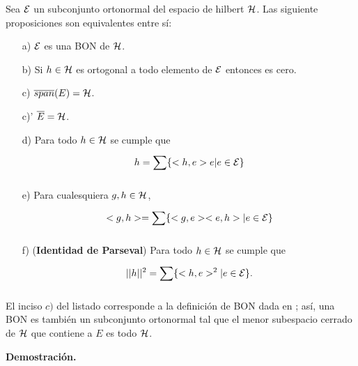 \begin{teo} \label{thm: Coway, 4.13}
Sea $\mathcal{E}$ un subconjunto ortonormal del espacio
de hilbert $\mathcal{H}$.
Las siguiente proposiciones son equivalentes entre sí:
\begin{itemize}
\item[a)] $\mathcal{E}$ es una BON de $\mathcal{H}$.
\item[b)] Si $h \in \mathcal{H}$ es ortogonal a todo elemento de 
$\mathcal{E}$ entonces es cero.
\item[c)] $\overline{span}(E)= \mathcal{H} $.
\item[c)'] $\overline{E}=\mathcal{H}$. 
\item[d)] Para todo $h \in \mathcal{H}$ se cumple que
\[
h = \sum\limits_{}^{}\{ <h,e> e | e \in \mathcal{E} \}
\]
\item[e)] Para cualesquiera $g, h \in \mathcal{H}$,
\[
<g,h>= \sum\limits_{}^{}\{ <g,e> <e,h> | e \in \mathcal{E} \}
\]
\item[f)](\textbf{Identidad de Parseval})
Para todo $h \in \mathcal{H}$ se cumple que
\[
||h||^{2}= \sum\limits_{}^{}\{ <h,e>^{2} | e \in \mathcal{E} \}.
\]
\end{itemize}
\end{teo}
\begin{nota}
El inciso $c)$ del listado corresponde a la definición
de BON dada en ; así, una BON
es también un subconjunto ortonormal tal que el menor
subespacio cerrado de $\mathcal{H}$ que contiene a $E$ es 
todo $\mathcal{H}$.
\end{nota}
\noindent
\textbf{Demostración.}
